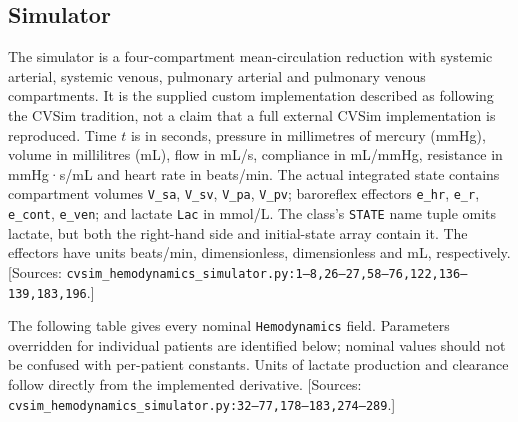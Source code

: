 \subsection{Simulator}


The simulator is a four-compartment mean-circulation reduction with systemic arterial, systemic venous, pulmonary arterial and pulmonary venous compartments. It is the supplied custom implementation described as following the CVSim tradition, not a claim that a full external CVSim implementation is reproduced. Time \(t\) is in seconds, pressure in millimetres of mercury (mmHg), volume in millilitres (mL), flow in mL/s, compliance in mL/mmHg, resistance in mmHg·s/mL and heart rate in beats/min. The actual integrated state contains compartment volumes \texttt{V\_\allowbreak{}sa}, \texttt{V\_\allowbreak{}sv}, \texttt{V\_\allowbreak{}pa}, \texttt{V\_\allowbreak{}pv}; baroreflex effectors \texttt{e\_\allowbreak{}hr}, \texttt{e\_\allowbreak{}r}, \texttt{e\_\allowbreak{}cont}, \texttt{e\_\allowbreak{}ven}; and lactate \texttt{Lac} in mmol/L. The class's \texttt{STATE} name tuple omits lactate, but both the right-hand side and initial-state array contain it. The effectors have units beats/min, dimensionless, dimensionless and mL, respectively. [Sources: \texttt{cvsim\_\allowbreak{}hemodynamics\_\allowbreak{}simulator.\allowbreak{}py:\allowbreak{}1–\allowbreak{}8,\allowbreak{}26–\allowbreak{}27,\allowbreak{}58–\allowbreak{}76,\allowbreak{}122,\allowbreak{}136–\allowbreak{}139,\allowbreak{}183,\allowbreak{}196}.]

The following table gives every nominal \texttt{Hemodynamics} field. Parameters overridden for individual patients are identified below; nominal values should not be confused with per-patient constants. Units of lactate production and clearance follow directly from the implemented derivative. [Sources: \texttt{cvsim\_\allowbreak{}hemodynamics\_\allowbreak{}simulator.\allowbreak{}py:\allowbreak{}32–\allowbreak{}77,\allowbreak{}178–\allowbreak{}183,\allowbreak{}274–\allowbreak{}289}.]

